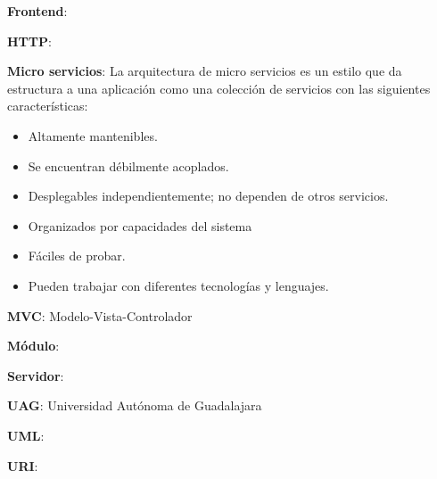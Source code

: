     \textbf{Frontend}:
    
    \textbf{HTTP}:
    
    \textbf{Micro servicios}: La arquitectura de micro servicios es un estilo que da estructura a una aplicación como una colección de servicios con las siguientes características:
    
    \begin{itemize}
        \item Altamente mantenibles.
        \item Se encuentran débilmente acoplados.
        \item Desplegables independientemente; no dependen de otros servicios.
        \item Organizados por capacidades del sistema
        \item Fáciles de probar.
        \item Pueden trabajar con diferentes tecnologías y lenguajes.
    \end{itemize}
    
    \textbf{MVC}: Modelo-Vista-Controlador
    
    \textbf{Módulo}:
    
    \textbf{Servidor}: 
    
    \textbf{UAG}: Universidad Autónoma de Guadalajara
    
    \textbf{UML}: 
    
    \textbf{URI}: